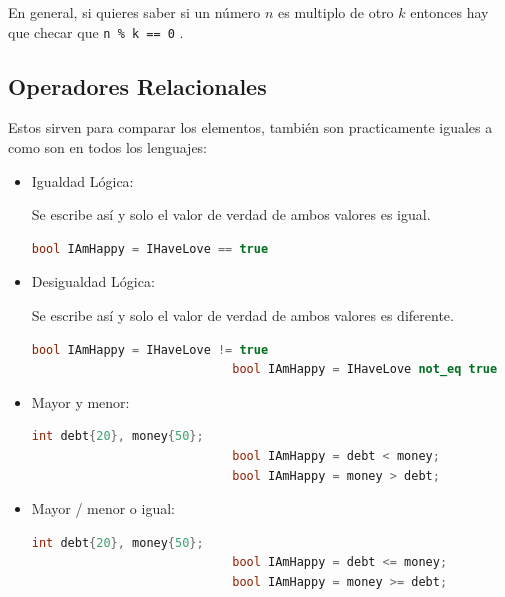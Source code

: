 \documentclass[12pt, fleqn]{report}                             %
\theoremstyle{break}                                            %
\newcommand{\textCode}[1]  { \texttt{#1} }                      %
\begin{document}
                    En general, si quieres saber si un número $n$ es multiplo de 
                    otro $k$ entonces hay que checar que \textCode{n \% k == 0}.

            \clearpage
            \subsection{Operadores Relacionales}

                Estos sirven para comparar los elementos, también son practicamente iguales a como son en todos los
                lenguajes:
                \begin{itemize}
                    \item Igualdad Lógica: 
                    
                        Se escribe así y solo el valor de verdad de ambos valores es igual.
                        \begin{lstlisting}[language=C++, gobble=28]
                            bool IAmHappy = IHaveLove == true
                        \end{lstlisting}
                    
                    \item Desigualdad Lógica: 
                    
                        Se escribe así y solo el valor de verdad de ambos valores es diferente.
                        \begin{lstlisting}[language=C++, gobble=28]
                            bool IAmHappy = IHaveLove != true
                            bool IAmHappy = IHaveLove not_eq true
                        \end{lstlisting}

                    \item Mayor y menor: 
                        \begin{lstlisting}[language=C++, gobble=28]
                            int debt{20}, money{50};
                            bool IAmHappy = debt < money;
                            bool IAmHappy = money > debt;
                        \end{lstlisting}

                    \item Mayor / menor o igual: 
                        \begin{lstlisting}[language=C++, gobble=28]
                            int debt{20}, money{50};
                            bool IAmHappy = debt <= money;
                            bool IAmHappy = money >= debt;
                        \end{lstlisting}
                \end{itemize}
\end{document}

